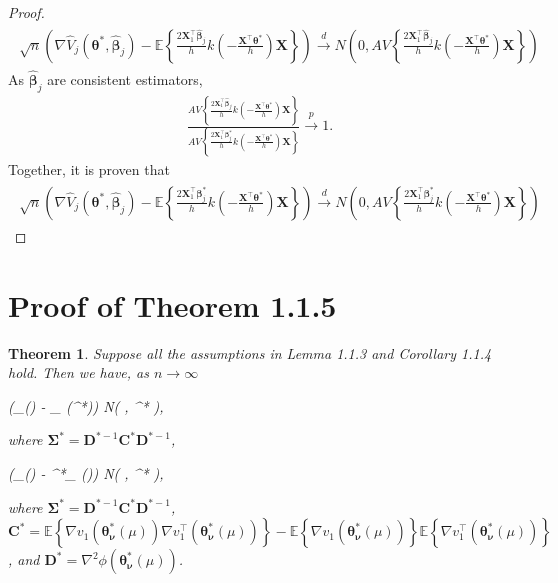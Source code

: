 \documentclass{article}
\newcommand{\wh}{\widehat}
\newcommand{\itl}{\intercal}
\newcommand{\bs}{ \boldsymbol}
\newcommand{\lt}{\left}
\newcommand{\rt}{\right}
\newtheorem{theorem}{Theorem}[section]
\begin{document}
\begin{appendices}
\begin{proof}
\begin{gather}
\begin{flalign*}
\sqrt{n}\lt(\nabla\wh{V}_j\lt(\bs{\theta}^* , \wh{\bs{\beta}}_j\rt) - \mathbb{E}\lt\{\frac{2\bs{X}_{1}^{\intercal}\wh{\bs{\beta}}_j}{h}k\lt(-\frac{\bs{X}^{\intercal}\bs{\theta}^*}{h}\rt)\bs{X}\rt\}\rt)\overset{d}{\to}N\lt(0,AV\lt\{\frac{2\bs{X}_1^{\itl}\wh{\bs{\beta}}_j}{h}k\lt(-\frac{\bs{X}^{\itl}\bs{\theta}^*}{h}\rt)\bs{X}\rt\}\rt)
\end{flalign*}
\end{gather}
As $\widehat{\bs{\beta}}_{j}$ are consistent estimators,
\begin{gather*}
\frac{AV\lt\{\frac{2\bs{X}_1^{\itl}\widehat{\bs{\beta}}_{j}}{h}k\lt(-\frac{\bs{X}^{\itl}\bs{\theta}^*}{h}\rt)\bs{X}\rt\}}{AV\lt\{\frac{2\bs{X}_1^{\itl}\bs{\beta}^*_{j}}{h}k\lt(-\frac{\bs{X}^{\itl}\bs{\theta}^*}{h}\rt)\bs{X}\rt\}} \overset{p}{\to} 1.
\end{gather*}
Together, it is proven that
	\begin{gather}
\begin{flalign*}
\sqrt{n}\lt(\nabla\wh{V}_j\lt(\bs{\theta}^* , \wh{\bs{\beta}}_j\rt) - \mathbb{E}\lt\{\frac{2\bs{X}_{1}^{\intercal}\bs{\beta}^*_j}{h}k\lt(-\frac{\bs{X}^{\intercal}\bs{\theta}^*}{h}\rt)\bs{X}\rt\}\rt)\overset{d}{\to}N\lt(0,AV\lt\{\frac{2\bs{X}_1^{\itl}\bs{\beta}^*_j}{h}k\lt(-\frac{\bs{X}^{\itl}\bs{\theta}^*}{h}\rt)\bs{X}\rt\}\rt)
\end{flalign*}
\end{gather}
\end{proof}		

\section{Proof of Theorem 1.1.5}
\begin{theorem}
	Suppose all the assumptions in Lemma 1.1.3 and Corollary 1.1.4 hold. Then we have, as $n\to \infty$
	\begin{flalign*}
	\lt(\widehat{\bs{\theta}}_{\nu}(\mu) - \bs{\theta}_{\bs{\nu}}(\mu^*)\rt)  N\lt(\bs{0}, \bs{\Sigma}^* \rt),
	\end{flalign*}
	where $\bs{\Sigma}^* = \bs{D}^{*-1}\bs{C}^{*}\bs{D}^{*-1}$, 
	
	\begin{flalign*}
	\lt(\widehat{\bs{\theta}}_{\nu}(\mu) - \bs{\theta}^*_{\bs{\nu}}(\mu)\rt)  N\lt(\bs{0}, \bs{\Sigma}^* \rt),
	\end{flalign*}
	where $\bs{\Sigma}^* = \bs{D}^{*-1}\bs{C}^{*}\bs{D}^{*-1}$, \\
	$\bs{C}^* =\mathbb{E}\lt\{  \nabla v_1\lt(\bs{\theta}^*_{\bs{\nu}}(\mu)\rt)\nabla v^{\itl}_1\lt(\bs{\theta}^*_{\bs{\nu}}(\mu)\rt) \rt\} - \mathbb{E}\lt\{\nabla v_1\lt(\bs{\theta}^*_{\bs{\nu}}(\mu)\rt)\rt\} \mathbb{E}\lt\{\nabla v^{\itl}_1\lt(\bs{\theta}^*_{\bs{\nu}}(\mu)\rt)\rt\}$, and $\bs{D}^*  =  \nabla^2 \phi(\bs{\theta}^*_{\bs{\nu}}(\mu))$.
\end{theorem}


\end{appendices}
\end{document}
